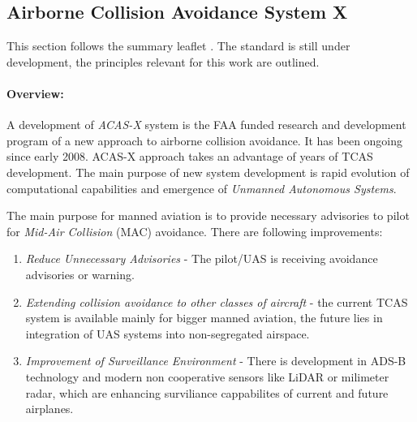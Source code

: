 \subsection{Airborne Collision Avoidance System X}\label{sec:ACASX}
\noindent This section follows the summary leaflet \cite{netalert2013n17}. The standard is still under development, the principles relevant for this work are outlined. 

\paragraph{Overview:} A development of \emph{ACAS-X} system is the FAA funded research and development program of a new approach to airborne collision avoidance. It has been ongoing since early 2008. ACAS-X approach takes an advantage of years of TCAS development. The main purpose of new system development is rapid evolution of computational capabilities and emergence of \emph{Unmanned Autonomous  Systems}.

The main purpose for manned aviation is to provide necessary advisories to pilot for \emph{Mid-Air Collision} (MAC) avoidance. There are following improvements:

\begin{enumerate}
    \item \emph{Reduce Unnecessary Advisories} - The pilot/UAS is receiving avoidance advisories or warning. 
    
    \item \emph{Extending collision avoidance to other classes of aircraft} - the current TCAS system is available mainly for bigger manned aviation, the future lies in integration of UAS systems into non-segregated airspace.
    
    \item \emph{Improvement of Surveillance Environment} - There is development in ADS-B technology and modern non cooperative sensors like LiDAR or milimeter radar, which are enhancing surviliance cappabilites of current and future airplanes.
\end{enumerate}

